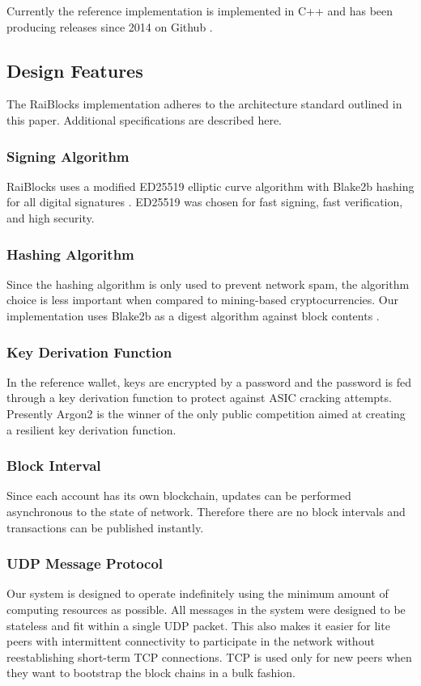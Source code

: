 Currently the reference implementation is implemented in C++ and has been producing releases since 2014 on Github \cite{LeMahieu_github}.

\subsection{Design Features}
The RaiBlocks implementation adheres to the architecture standard outlined in this paper. Additional specifications are described here.

\subsubsection{Signing Algorithm}
RaiBlocks uses a modified ED25519 elliptic curve algorithm with Blake2b hashing for all digital signatures \cite{Bernstein_ED25519}. ED25519 was chosen for fast signing, fast verification, and high security.

\subsubsection{Hashing Algorithm}
Since the hashing algorithm is only used to prevent network spam, the algorithm choice is less important when compared to mining-based cryptocurrencies. Our implementation uses Blake2b as a digest algorithm against block contents \cite{Aumasson_blake2}.

\subsubsection{Key Derivation Function}
In the reference wallet, keys are encrypted by a password and the password is fed through a key derivation function to protect against ASIC cracking attempts. Presently Argon2 \cite{Biryukov_argon2} is the winner of the only public competition aimed at creating a resilient key derivation function.

\subsubsection{Block Interval}
Since each account has its own blockchain, updates can be performed asynchronous to the state of network. Therefore there are no block intervals and transactions can be published instantly.

\subsubsection{UDP Message Protocol}
Our system is designed to operate indefinitely using the minimum amount of computing resources as possible. All messages in the system were designed to be stateless and fit within a single UDP packet. This also makes it easier for lite peers with intermittent connectivity to participate in the network without reestablishing short-term TCP connections. TCP is used only for new peers when they want to bootstrap the block chains in a bulk fashion.


